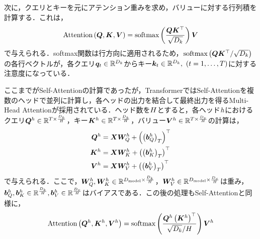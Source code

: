 次に，クエリとキーを元にアテンション重みを求め，バリューに対する行列積を計算する．これは，
\begin{equation}
    \text{Attention}\left(\bm{Q}, \bm{K}, \bm{V}\right) = \text{softmax}\left(\frac{\bm{Q}\bm{K}^\top}{\sqrt{D_{k}}}\right) \bm{V}
\end{equation}
で与えられる．softmax関数は行方向に適用されるため，$\text{softmax}\left(\bm{Q}\bm{K}^\top / \sqrt{D_{k}}\right)$の各行ベクトルが，各クエリ$\bm{q}_{t} \in \mathbb{R}^{D_{k}}$からキー$\bm{k}_{t} \in \mathbb{R}^{D_{k}}, ~ \left(t = 1, \ldots, T\right)$に対する注意度になっている．

ここまでがSelf-Attentionの計算であったが，TransformerではSelf-Attentionを複数のヘッドで並列に計算し，各ヘッドの出力を結合して最終出力を得るMulti-Head Attentionが採用されている．ヘッド数を$H$とすると，各ヘッド$h$におけるクエリ$\bm{Q}^{h} \in \mathbb{R}^{T \times \frac{D_{k}}{H}}$，キー$\bm{K}^{h} \in \mathbb{R}^{T \times \frac{D_{k}}{H}}$，バリュー$\bm{V}^{h} \in \mathbb{R}^{T \times \frac{D_{v}}{H}}$の計算は，
\begin{align}
    \bm{Q}^{h} & = \bm{X}\bm{W}_{Q}^{h} + \left(\left(\bm{b}_{Q}^{h}\right)_{T}\right)^\top \\
    \bm{K}^{h} & = \bm{X}\bm{W}_{K}^{h} + \left(\left(\bm{b}_{K}^{h}\right)_{T}\right)^\top \\
    \bm{V}^{h} & = \bm{X}\bm{W}_{V}^{h} + \left(\left(\bm{b}_{V}^{h}\right)_{T}\right)^\top
\end{align}
で与えられる．ここで，$\bm{W}_{Q}^{h}, \bm{W}_{K}^{h} \in \mathbb{R}^{D_{\text{model}} \times \frac{D_{k}}{H}}$，$\bm{W}_{V}^{h} \in \mathbb{R}^{D_{\text{model}} \times \frac{D_{v}}{H}}$は重み，$\bm{b}_{Q}^{h}, \bm{b}_{K}^{h} \in \mathbb{R}^{\frac{D_{k}}{H}}, \bm{b}_{V}^{h} \in \mathbb{R}^{\frac{D_{v}}{H}}$はバイアスである．この後の処理もSelf-Attentionと同様に，
\begin{equation}
    \text{Attention}\left(\bm{Q}^{h}, \bm{K}^{h}, \bm{V}^{h}\right) = \text{softmax}\left(\frac{\bm{Q}^{h}\left(\bm{K}^{h}\right)^\top}{\sqrt{D_{k}} / H}\right) \bm{V}^{h}
\end{equation}
